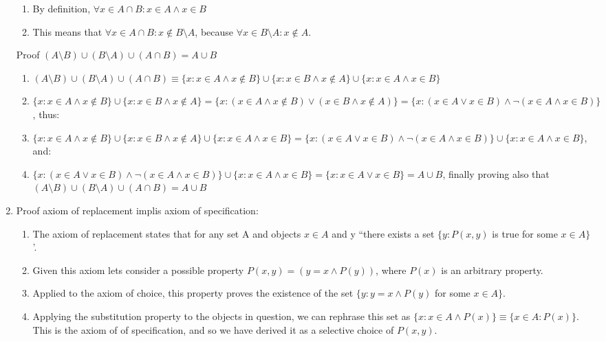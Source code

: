 \documentclass{article}
\begin{document}
\begin{enumerate}
\begin{enumerate}
                \item By definition, $\forall x \in A \cap B: x \in A \land x \in B$
                \item This means that $\forall x \in A \cap B: x \notin B \setminus A$, because
                    $\forall x \in B \setminus A: x \notin A$.
            \end{enumerate}
            Proof $(A \setminus B) \cup (B \setminus A) \cup (A \cap B) = A \cup B$
            \begin{enumerate}
                \item $(A \setminus B) \cup (B \setminus A) \cup (A \cap B)
                    \equiv \{x : x \in A \land x \notin B\} \cup \{x : x \in B
                    \land x \notin A\} \cup \{x : x \in A \land x \in B\}$
                \item $\{x : x \in A \land x \notin B\} \cup \{x : x \in B
                    \land x \notin A\} = \{x : (x \in A \land x \notin B) \lor
                    (x \in B \land x \notin A) \} = \{x : (x \in A \lor x \in B)
                    \land \neg(x \in A \land x \in B)\}$, thus:
                \item $\{x : x \in A \land x \notin B\} \cup \{x : x \in B
                    \land x \notin A\} \cup \{x : x \in A \land x \in B\} = \{x : (x \in A \lor x \in B)
                    \land \neg(x \in A \land x \in B)\} \cup \{x : x \in A \land x \in B\}$, and:
                \item $\{x : (x \in A \lor x \in B) \land \neg(x \in A \land x
                    \in B)\} \cup \{x : x \in A \land x \in B\} = \{x : x \in A
                    \lor x \in B\} = A \cup B$, finally proving also that $(A \setminus B) \cup (B \setminus A) \cup (A \cap B) = A \cup B$
            \end{enumerate}
        \item Proof axiom of replacement implis axiom of specification:
            \begin{enumerate}
                \item The axiom of replacement states that for any set A and
                    objects $x \in A$ and y ``there exists a set $\{y : P(x, y)$
                    is true for some $x \in A\}$'.
                \item Given this axiom lets consider a possible property $P(x,y) = (y = x \land P(y))$, where
                    $P(x)$ is an arbitrary property.
                \item Applied to the axiom of choice, this property proves the
                    existence of the set $\{y : y = x \land P(y) $ for some $x
                    \in A\}$. 
                \item Applying the substitution property to the objects in
                    question, we can rephrase this set as $\{x: x \in A \land
                    P(x)\} \equiv \{x \in A: P(x)\}$. This is the axiom of 
                    of specification, and so we have derived it as a selective
                    choice of $P(x,y)$.
            \end{enumerate}
    \end{enumerate}
\end{document}
